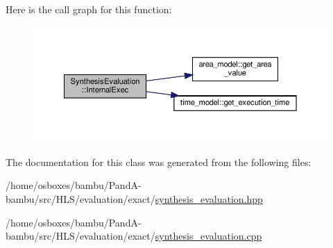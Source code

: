 Here is the call graph for this function\+:
\nopagebreak
\begin{figure}[H]
\begin{center}
\leavevmode
\includegraphics[width=350pt]{d6/d46/classSynthesisEvaluation_a0086eea12b3721703d95d0031ed54257_cgraph}
\end{center}
\end{figure}


The documentation for this class was generated from the following files\+:\begin{DoxyCompactItemize}
\item 
/home/osboxes/bambu/\+Pand\+A-\/bambu/src/\+H\+L\+S/evaluation/exact/\hyperlink{synthesis__evaluation_8hpp}{synthesis\+\_\+evaluation.\+hpp}\item 
/home/osboxes/bambu/\+Pand\+A-\/bambu/src/\+H\+L\+S/evaluation/exact/\hyperlink{synthesis__evaluation_8cpp}{synthesis\+\_\+evaluation.\+cpp}\end{DoxyCompactItemize}
